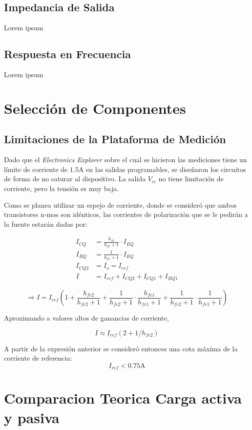 \subsection{Impedancia de Salida}
Lorem ipsum
\subsection{Respuesta en Frecuencia}
Lorem ipsum

\section{Selección de Componentes}
\subsection{Limitaciones de la Plataforma de Medición} \label{sec:EE_limits}

Dado que el \textit{Electronics Explorer} sobre el cual se hicieron las mediciones tiene un límite de corriente de $1.5 \si{\ampere}$ en las salidas programables, se diseñaron los circuitos de forma de no saturar al dispositivo. La salida $V_{cc}$ no tiene limitación de corriente, pero la tensión es muy baja.

Como se planea utilizar un espejo de corriente, donde se consideró que ambos transistores n-mos son idénticos, las corrientes de polarización que se le pedirán a la fuente estarán dadas por:

\begin{align*}
    I_{CQ} &= \frac{h_{fe}}{h_{fe}+1} \cdot I_{EQ} \\
    I_{BQ} &= \frac{1}{h_{fe}+1} \cdot I_{EQ}\\
    I_{CQ2} &= I_o = I_{ref} \\
    I &= I_{ref} + I_{CQ2} + I_{CQ1} + I_{BQ1}
\end{align*}

\begin{equation}
    \Rightarrow I = I_{ref} \left(1 + \frac{h_{fe2}}{h_{fe2}+1} + \frac{1}{h_{fe2}+1}\cdot\frac{h_{fe1}}{h_{fe1}+1}+\frac{1}{h_{fe2}+1}\cdot\frac{1}{h_{fe1}+1}\right)
\end{equation}

Aproximando a valores altos de ganancias de corriente,

\begin{equation}
    I \approx I_{ref}\left(2+1/h_{fe2}\right)
\end{equation}

A partir de la expresión anterior se consideró entonces una cota máxima de la corriente de referencia:
\begin{equation}
    I_{ref} < 0.75 \si{\ampere}
    \label{eq:Iref}
\end{equation}

\section{Comparacion Teorica Carga activa y pasiva}

